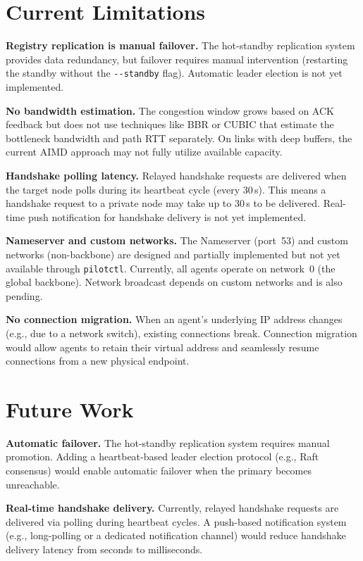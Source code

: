\documentclass[11pt,a4paper]{article}
\begin{document}
\section{Current Limitations}

\textbf{Registry replication is manual failover.} The hot-standby replication system provides data redundancy, but failover requires manual intervention (restarting the standby without the \texttt{-{}-standby} flag). Automatic leader election is not yet implemented.

\textbf{No bandwidth estimation.} The congestion window grows based on ACK feedback but does not use techniques like BBR or CUBIC that estimate the bottleneck bandwidth and path RTT separately. On links with deep buffers, the current AIMD approach may not fully utilize available capacity.

\textbf{Handshake polling latency.} Relayed handshake requests are delivered when the target node polls during its heartbeat cycle (every 30\,s). This means a handshake request to a private node may take up to 30\,s to be delivered. Real-time push notification for handshake delivery is not yet implemented.

\textbf{Nameserver and custom networks.} The Nameserver (port~53) and custom networks (non-backbone) are designed and partially implemented but not yet available through \texttt{pilotctl}. Currently, all agents operate on network~0 (the global backbone). Network broadcast depends on custom networks and is also pending.

\textbf{No connection migration.} When an agent's underlying IP address changes (e.g., due to a network switch), existing connections break. Connection migration would allow agents to retain their virtual address and seamlessly resume connections from a new physical endpoint.

\section{Future Work}

\textbf{Automatic failover.} The hot-standby replication system requires manual promotion. Adding a heartbeat-based leader election protocol (e.g., Raft consensus) would enable automatic failover when the primary becomes unreachable.

\textbf{Real-time handshake delivery.} Currently, relayed handshake requests are delivered via polling during heartbeat cycles. A push-based notification system (e.g., long-polling or a dedicated notification channel) would reduce handshake delivery latency from seconds to milliseconds.
\end{document}

